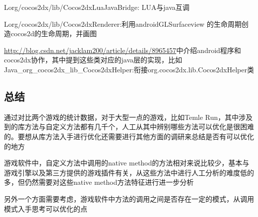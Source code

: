 Lorg/cocos2dx/lib/Cocos2dxLuaJavaBridge: LUA与java互调

Lorg/cocos2dx/lib/Cocos2dxRenderer:利用androidGLSurfaceview 的生命周期创造cocos2d的生命周期，并画图

\url{http://blog.csdn.net/jacklam200/article/details/8965457}中介绍android程序和cocos2dx协作，其中提到这些类对应的java层的实现，比如Java\_org\_cocos2dx\_lib\_Cocos2dxHelper:衔接org.cocos2dx.lib.Cocos2dxHelper类
 
\subsection{总结}
通过对比两个游戏的统计数据，对于大型一点的游戏，比如Temle Run，其中涉及到的库方法与自定义方法都有几千个，人工从其中辨别哪些方法可以优化是很困难的。要想从库方法入手进行优化还需要进行其他方面的调研来总结是否有可以优化的地方

游戏软件中，自定义方法中调用的native method的方法相对来说比较少，基本与游戏引擎以及第三方提供的游戏插件有关，从这些方法中进行人工分析的难度低的多，但仍然需要对这些native method方法特征进行进一步分析

另外一个方面需要考虑，游戏软件中方法的调用之间是否存在一定的模式，从调用模式入手思考可以优化的点


